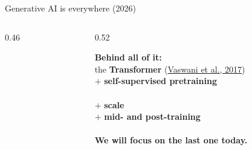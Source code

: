 \begin{frame}{Generative AI is everywhere (2026)}
\begin{columns}[T]
\begin{column}{0.46\textwidth}
\vspace{6pt}
\end{column}
\begin{column}{0.52\textwidth}
\vspace{10pt}
\begin{tcolorbox}[enhanced,colback=uvanavy!6,colframe=uvanavy,boxrule=1pt,arc=3pt,left=8pt,right=8pt,top=8pt,bottom=8pt]
\raggedright
\textbf{Behind all of it:}\\[6pt]
the \textbf{Transformer} (\href{https://arxiv.org/abs/1706.03762}{Vaswani et al., 2017})\\[3pt]
$+$ \textbf{self-supervised pretraining}\\ \hspace*{1.2em}{\small(on trillions of words of web text)}\\[3pt]
$+$ \textbf{scale}\\[3pt]
$+$ \textbf{mid- and post-training}\\ \hspace*{1.2em}{\small(fine-tuning, alignment, RL)}\\[8pt]
\textcolor{uvaorange!85!black}{\textbf{We will focus on the last one today.}}
\end{tcolorbox}
\end{column}
\end{columns}
\end{frame}


